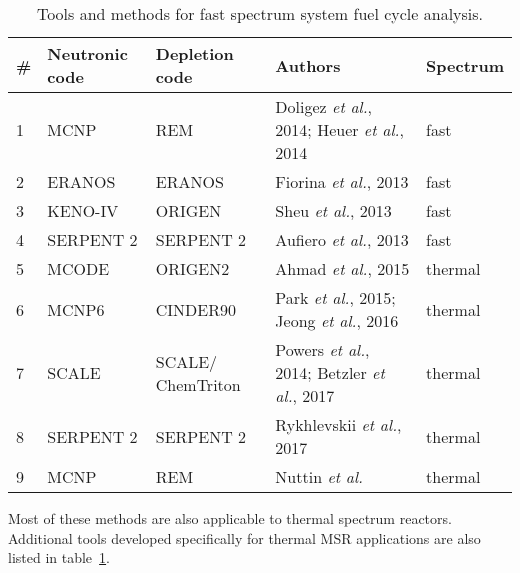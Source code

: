 \begin{table}[h!]
\centering
\caption{Tools and methods for fast spectrum system fuel cycle analysis.}
\begin{tabular}{ |m{}|m{}|m{}|m{}|m{}|} 
\hline
\# & Neutronic code  & Depletion code    & \qquad Authors & Spectrum   \\[3pt]
\hline
1 & \gls{MCNP} \cite{noauthor_mcnp_2004}      & REM \cite{heuer_simulation_2010}  & Doligez \emph{et al.}, 2014; Heuer \emph{et al.}, 2014  \cite{doligez_coupled_2014,heuer_towards_2014}    & fast \\[5pt]
\hline
2 & ERANOS \cite{ruggieri_eranos_2006}      & ERANOS     & Fiorina \emph{et al.}, 2013 \cite{fiorina_investigation_2013}            & fast \\[5pt]
\hline
3 & KENO-IV \cite{goluoglu_monte_2011}     & ORIGEN \cite{gauld_isotopic_2011}     & Sheu \emph{et al.}, 2013 \cite{sheu_depletion_2013} & fast \\[5pt]
\hline
4 & SERPENT 2 \cite{leppanen_serpent_2015}   & SERPENT 2  & Aufiero \emph{et al.}, 2013 \cite{aufiero_extended_2013} & fast \\[5pt]
\hline
5 & MCODE \cite{xu_mcode_2008}      & ORIGEN2 \cite{croff_users_1980}      & Ahmad \emph{et al.}, 2015 \cite{ahmad_neutronics_2015}   & thermal  \\[5pt]
\hline
6 & \gls{MCNP}6     & CINDER90 \cite{goorley_mcnp6_2013}     & Park \emph{et al.}, 2015; Jeong \emph{et al.}, 2016 \cite{park_whole_2015, jeong_equilibrium_2016}& thermal\\[5pt]
\hline
7 & SCALE \cite{bowman_scale_2011}      & SCALE/ ChemTriton \cite{powers_new_2013}    & Powers \emph{et al.}, 2014; Betzler \emph{et al.}, 2017 \cite{powers_new_2013,powers_inventory_2014,betzler_molten_2017}& thermal\\[5pt]
\hline
8 & SERPENT 2      & SERPENT 2     & Rykhlevskii \emph{et al.}, 2017 \cite{rykhlevskii_online_2017} & thermal\\[5pt]
\hline
9 & \gls{MCNP}      & REM  & Nuttin \emph{et al.} \cite{nuttin_potential_2005}&thermal  \\[5pt]
\hline
\end{tabular}
  \vspace{-1.1em}
  \label{tab:fs_codes}
\end{table}

Most of these methods are also applicable to thermal spectrum reactors. Additional tools developed specifically for thermal \gls{MSR} applications are also listed in table~\ref{tab:fs_codes}.

